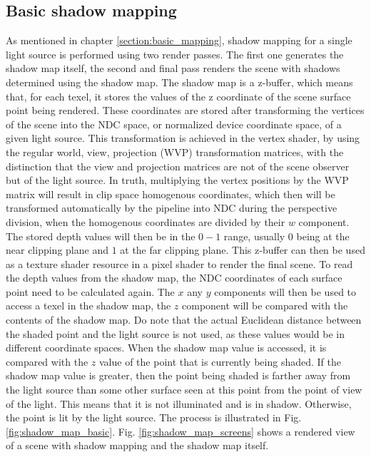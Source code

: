 \subsection{Basic shadow mapping}
\label{section:basic_mapping_impl}
As mentioned in chapter \ref{section:basic_mapping}, shadow mapping for a single light source is performed using two render passes. The first one generates the shadow map itself, the second and final pass renders the scene with shadows determined using the shadow map. The shadow map is a z-buffer, which means that, for each texel, it stores the values of the z coordinate of the scene surface point being rendered. These coordinates are stored after transforming the vertices of the scene into the NDC space, or normalized device coordinate space, of a given light source. This transformation is achieved in the vertex shader, by using the regular world, view, projection (WVP) transformation matrices, with the distinction that the view and projection matrices are not of the scene observer but of the light source. In truth, multiplying the vertex positions by the WVP matrix will result in clip space homogenous coordinates, which then will be transformed automatically by the pipeline into NDC during the perspective division, when the homogenous coordinates are divided by their \(w\) component. The stored depth values will then be in the \(0-1\) range, usually \(0\) being at the near clipping plane and \(1\) at the far clipping plane. This z-buffer can then be used as a texture shader resource in a pixel shader to render the final scene. To read the depth values from the shadow map, the NDC coordinates of each surface point need to be calculated again. The \(x\) any \(y\) components will then be used to access a texel in the shadow map, the \(z\) component will be compared with the contents of the shadow map. Do note that the actual Euclidean distance between the shaded point and the light source is not used, as these values would be in different coordinate spaces. When the shadow map value is accessed, it is compared with the \(z\) value of the point that is currently being shaded. If the shadow map value is greater, then the point being shaded is farther away from the light source than some other surface seen at this point from the point of view of the light. This means that it is not illuminated and is in shadow. Otherwise, the point is lit by the light source. The process is illustrated in Fig. \ref{fig:shadow_map_basic}. Fig. \ref{fig:shadow_map_screens} shows a rendered view of a scene with shadow mapping and the shadow map itself.


